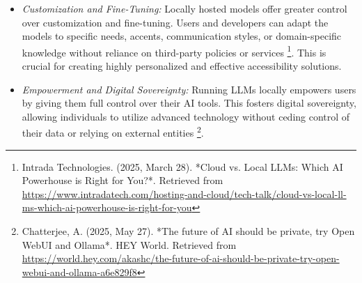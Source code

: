 \begin{itemize}
    \item \emph{Customization and Fine-Tuning:} Locally hosted models offer greater control over customization and fine-tuning. Users and developers can adapt the models to specific needs, accents, communication styles, or domain-specific knowledge without reliance on third-party policies or services \footnote{Intrada Technologies. (2025, March 28). *Cloud vs. Local LLMs: Which AI Powerhouse is Right for You?*. Retrieved from \url{https://www.intradatech.com/hosting-and-cloud/tech-talk/cloud-vs-local-ll-ms-which-ai-powerhouse-is-right-for-you}}. This is crucial for creating highly personalized and effective accessibility solutions.
    \item \emph{Empowerment and Digital Sovereignty:} Running LLMs locally empowers users by giving them full control over their AI tools. This fosters digital sovereignty, allowing individuals to utilize advanced technology without ceding control of their data or relying on external entities \footnote{Chatterjee, A. (2025, May 27). *The future of AI should be private, try Open WebUI and Ollama*. HEY World. Retrieved from \url{https://world.hey.com/akashc/the-future-of-ai-should-be-private-try-open-webui-and-ollama-a6e829f8}}.
\end{itemize}

